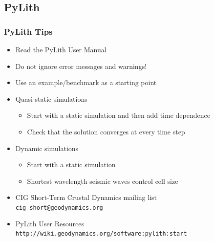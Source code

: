 \documentclass{beamer}
\newcommand{\important}[1]{{\color{red}#1}}
\begin{document}
\subsection{PyLith}

\begin{frame}
  \frametitle{PyLith Tips}
  \summary{}
 
  \begin{itemize}
  \item \important{Read the PyLith User Manual}
  \item \important{Do not ignore error messages and warnings!}
  \item Use an example/benchmark as a starting point
  \item Quasi-static simulations
    \begin{itemize}
    \item Start with a static simulation and then add time dependence
    \item \important{Check that the solution converges at every time step}
    \end{itemize}
  \item Dynamic simulations
    \begin{itemize}
    \item Start with a static simulation
    \item \important{Shortest wavelength seismic waves control cell size}
    \end{itemize}
  \item CIG Short-Term Crustal Dynamics mailing list\\
    {\tt \important{cig-short@geodynamics.org}}
  \item PyLith User Resources\\
    {\small\tt \important{http://wiki.geodynamics.org/software:pylith:start}}
  \end{itemize}

\end{frame}
\end{document}
